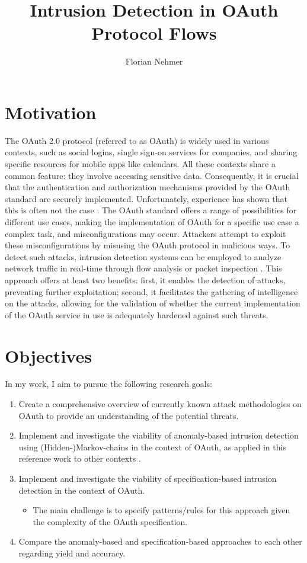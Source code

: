 \documentclass{article}
\title{Intrusion Detection in OAuth Protocol Flows}
\author{Florian Nehmer}
\begin{document}
\maketitle

\section{Motivation}
The OAuth 2.0 protocol \cite{rfc6749} (referred to as OAuth) is widely used in various contexts, such as social logins, single sign-on services for companies, and sharing specific resources for mobile apps like calendars. All these contexts share a common feature: they involve accessing sensitive data. Consequently, it is crucial that the authentication and authorization mechanisms provided by the OAuth standard are securely implemented. Unfortunately, experience has shown that this is often not the case \cite{Li2019}. The OAuth standard offers a range of possibilities for different use cases, making the implementation of OAuth for a specific use case a complex task, and misconfigurations may occur. Attackers attempt to exploit these misconfigurations by misusing the OAuth protocol in malicious ways. To detect such attacks, intrusion detection systems can be employed to analyze network traffic in real-time through flow analysis or packet inspection \cite{Liu2019}. This approach offers at least two benefits: first, it enables the detection of attacks, preventing further exploitation; second, it facilitates the gathering of intelligence on the attacks, allowing for the validation of whether the current implementation of the OAuth service in use is adequately hardened against such threats.

\section{Objectives}
In my work, I aim to pursue the following research goals:

\begin{enumerate}
    \item Create a comprehensive overview of currently known attack methodologies on OAuth to provide an understanding of the potential threats.
    \item Implement and investigate the viability of anomaly-based intrusion detection using (Hidden-)Markov-chains in the context of OAuth, as applied in this reference work to other contexts \cite{sperotto2011} \cite{chen2016} \cite{amato2018}.
    \item Implement and investigate the viability of specification-based intrusion detection in the context of OAuth.
    \begin{itemize}
        \item The main challenge is to specify patterns/rules for this approach given the complexity of the OAuth specification.
    \end{itemize}
    \item Compare the anomaly-based and specification-based approaches to each other regarding yield and accuracy.
\end{enumerate}
\end{document}
